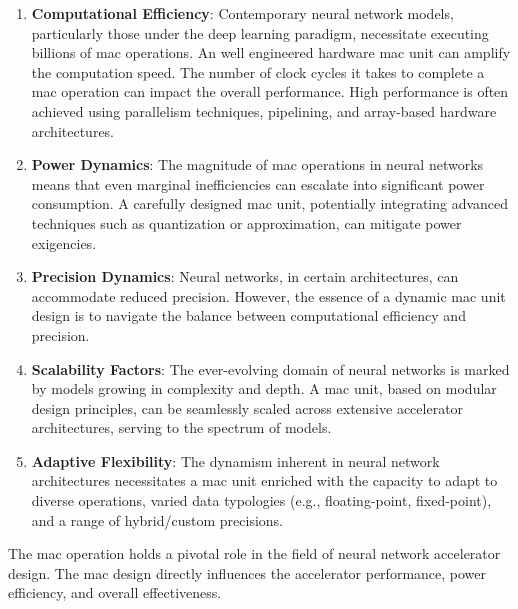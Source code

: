 \begin{enumerate}
	\item \textbf{Computational Efficiency}: Contemporary neural network models, particularly those under the deep learning paradigm, necessitate executing billions of \gls{mac} operations. An well engineered hardware \gls{mac} unit can amplify the computation speed. The number of clock cycles it takes to complete a \gls{mac} operation can impact the overall performance. High performance is often achieved using parallelism techniques, pipelining, and array-based hardware architectures.
	
	\item \textbf{Power Dynamics}: The magnitude of \gls{mac} operations in neural networks means that even marginal inefficiencies can escalate into significant power consumption. A carefully designed \gls{mac} unit, potentially integrating advanced techniques such as quantization or approximation, can mitigate power exigencies.
	
	\item \textbf{Precision Dynamics}: Neural networks, in certain architectures, can accommodate reduced precision. However, the essence of a dynamic \gls{mac} unit design is to navigate the balance between computational efficiency and precision.
	
	\item \textbf{Scalability Factors}: The ever-evolving domain of neural networks is marked by models growing in complexity and depth. A \gls{mac} unit, based on modular design principles, can be seamlessly scaled across extensive accelerator architectures, serving to the spectrum of models.
	
	\item \textbf{Adaptive Flexibility}: The dynamism inherent in neural network architectures necessitates a \gls{mac} unit enriched with the capacity to adapt to diverse operations, varied data typologies (e.g., floating-point, fixed-point), and a range of hybrid/custom precisions.
\end{enumerate}

The \gls{mac} operation holds a pivotal role in the field of neural network accelerator design. The \gls{mac} design directly influences the accelerator performance, power efficiency, and overall effectiveness.



